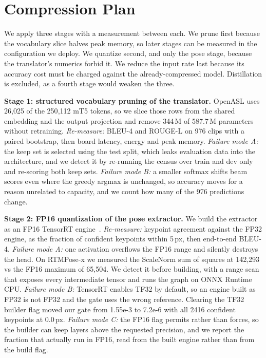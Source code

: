\documentclass[conference]{IEEEtran}
\begin{document}
\section{Compression Plan}

We apply three stages with a measurement between each. We prune first because the
vocabulary slice halves peak memory, so later stages can be measured in the configuration
we deploy. We quantize second, and only the pose stage, because the
translator's numerics forbid it. We reduce the input rate last because its accuracy cost
must be charged against the already-compressed model. Distillation is excluded, as a
fourth stage would weaken the three.

\textbf{Stage 1: structured vocabulary pruning of the translator.} OpenASL uses 26{,}025
of the 250{,}112 mT5 tokens, so we slice those rows from the shared embedding and the
output projection and remove 344\,M of 587.7\,M parameters without retraining.
\emph{Re-measure:} BLEU-4 and ROUGE-L on 976 clips with a paired bootstrap, then board
latency, energy and peak memory. \emph{Failure mode A:} the keep set is selected using the
test split, which leaks evaluation data into the architecture, and we detect it by
re-running the census over train and dev only and re-scoring both keep sets.
\emph{Failure mode B:} a smaller softmax shifts beam scores even where the greedy argmax
is unchanged, so accuracy moves for a reason unrelated to capacity, and we count how many
of the 976 predictions change.

\textbf{Stage 2: FP16 quantization of the pose extractor.} We build the extractor as an
FP16 TensorRT engine~\cite{trt}. \emph{Re-measure:} keypoint agreement against the FP32 engine, as
the fraction of confident keypoints within 5\,px, then end-to-end BLEU-4. \emph{Failure
mode A:} one activation overflows the FP16 range and silently destroys the head. On
RTMPose-x we measured the ScaleNorm sum of squares at 142{,}293 vs the FP16 maximum of
65{,}504. We detect it before building, with a range scan that exposes every intermediate
tensor and runs the graph on ONNX Runtime CPU.
\emph{Failure mode B:} TensorRT enables TF32 by default, so an engine built as FP32 is not
FP32 and the gate uses the wrong reference. Clearing the TF32 builder flag moved our gate
from 1.55e-3 to 7.2e-6 with all 2416 confident keypoints at 0.0\,px. \emph{Failure mode C:} the
FP16 flag permits rather than forces, so the builder can keep layers above the requested
precision, and we report the fraction that actually run in FP16, read from the built
engine rather than from the build flag.
\end{document}
